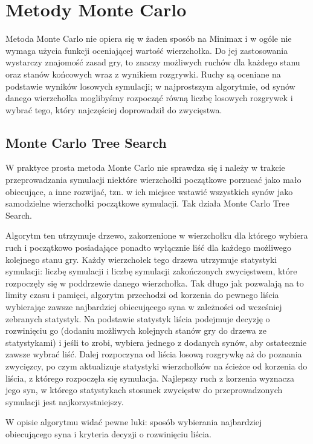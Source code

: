\documentclass{pracamgr}
\begin{document}
\section{Metody Monte Carlo}

Metoda Monte Carlo nie opiera się w żaden sposób na Minimax i w ogóle nie wymaga użycia funkcji oceniającej wartość wierzchołka.
Do jej zastosowania wystarczy znajomość zasad gry, to znaczy możliwych ruchów dla każdego stanu oraz stanów końcowych wraz z wynikiem rozgrywki.
Ruchy są oceniane na podstawie wyników losowych symulacji; w najprostszym algorytmie, od synów danego wierzchołka moglibyśmy rozpocząć równą liczbę losowych rozgrywek i wybrać tego, który najczęściej doprowadził do zwycięstwa.

\subsection{Monte Carlo Tree Search}

W praktyce prosta metoda Monte Carlo nie sprawdza się i należy w trakcie przeprowadzania symulacji niektóre wierzchołki początkowe porzucać jako mało obiecujące, a inne rozwijać, tzn. w ich miejsce wstawić wszystkich synów jako samodzielne wierzchołki początkowe symulacji.
Tak działa Monte Carlo Tree Search.

Algorytm ten utrzymuje drzewo, zakorzenione w wierzchołku dla którego wybiera ruch i początkowo posiadające ponadto wyłącznie liść dla każdego możliwego kolejnego stanu gry.
Każdy wierzchołek tego drzewa utrzymuje statystyki symulacji: liczbę symulacji i liczbę symulacji zakończonych zwycięstwem, które rozpoczęły się w poddrzewie danego wierzchołka.
Tak długo jak pozwalają na to limity czasu i pamięci, algorytm przechodzi od korzenia do pewnego liścia wybierając zawsze najbardziej obiecującego syna w zależności od wcześniej zebranych statystyk. Na podstawie statystyk liścia podejmuje decyzję o rozwinięciu go (dodaniu możliwych kolejnych stanów gry do drzewa ze statystykami) i jeśli to zrobi, wybiera jednego z dodanych synów, aby ostatecznie zawsze wybrać liść.
Dalej rozpoczyna od liścia losową rozgrywkę aż do poznania zwycięzcy, po czym aktualizuje statystyki wierzchołków na ścieżce od korzenia do liścia, z którego rozpoczęła się symulacja.
Najlepszy ruch z korzenia wyznacza jego syn, w którego statystykach stosunek zwycięstw do przeprowadzonych symulacji jest najkorzystniejszy.

W opisie algorytmu widać pewne luki: sposób wybierania najbardziej obiecującego syna i kryteria decyzji o rozwinięciu liścia.
\end{document}
